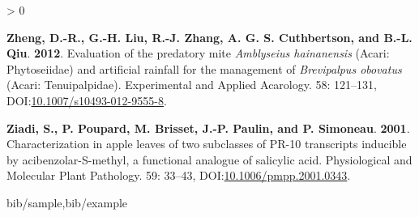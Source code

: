 \documentclass[12pt,final,CPage]{ufthesis}
\newlength{\cslhangindent}
\newenvironment{CSLReferences}[2] %
{%
	\setlength{\parindent}{0pt}
	\ifodd #1 \everypar{\setlength{\hangindent}{\cslhangindent}}\ignorespaces\fi
	\ifnum #2 > 0
	\setlength{\parskip}{#2\baselineskip}
	\fi
}%
{}
\begin{document}
{\begin{CSLReferences}{1}{0}
  \leavevmode{}%
  \textbf{Zheng, D.-R., G.-H. Liu, R.-J. Zhang, A. G. S. Cuthbertson, and B.-L. Qiu}. \textbf{2012}. Evaluation of the predatory mite {\emph{Amblyseius hainanensis}} ({Acari}: {Phytoseiidae}) and artificial rainfall for the management of {\emph{Brevipalpus obovatus}} ({Acari}: {Tenuipalpidae}). Experimental and Applied Acarology. 58: 121--131, DOI:\href{https://doi.org/10.1007/s10493-012-9555-8}{10.1007/s10493-012-9555-8}.

  \leavevmode{}%
  \textbf{Ziadi, S., P. Poupard, M. Brisset, J.-P. Paulin, and P. Simoneau}. \textbf{2001}. Characterization in apple leaves of two subclasses of {PR}-10 transcripts inducible by acibenzolar-{S}-methyl, a functional analogue of salicylic acid. Physiological and Molecular Plant Pathology. 59: 33--43, DOI:\href{https://doi.org/10.1006/pmpp.2001.0343}{10.1006/pmpp.2001.0343}.

  \end{CSLReferences}
 {bib/sample,bib/example}

\end{document}
